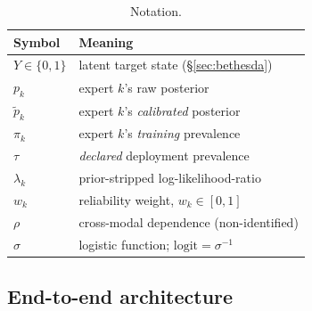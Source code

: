 \documentclass[sigplan,nonacm,screen]{acmart}
\begin{document}
\begin{table}[t]
\caption{Notation.}
\label{tab:notation}
\footnotesize
\setlength{\tabcolsep}{4pt}
\begin{tabular}{@{}lp{5.4cm}@{}}
\toprule
\textbf{Symbol} & \textbf{Meaning} \\
\midrule
$Y\in\{0,1\}$ & latent target state (§\ref{sec:bethesda}) \\
$p_k$ & expert $k$'s raw posterior \\
$\tilde p_k$ & expert $k$'s \emph{calibrated} posterior \\
$\pi_k$ & expert $k$'s \emph{training} prevalence \\
$\tau$ & \emph{declared} deployment prevalence \\
$\lambda_k$ & prior-stripped log-likelihood-ratio \\
$w_k$ & reliability weight, $w_k\in[0,1]$ \\
$\rho$ & cross-modal dependence (non-identified) \\
$\sigma$ & logistic function; $\mathrm{logit}=\sigma^{-1}$ \\
\bottomrule
\end{tabular}
\end{table}

\subsection{End-to-end architecture}
\end{document}
